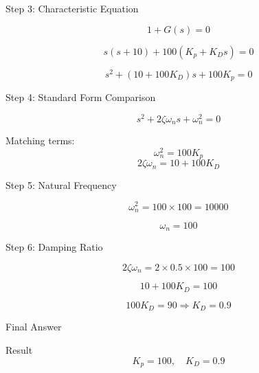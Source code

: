\documentclass{beamer}
\begin{document}
\begin{frame}{Step 3: Characteristic Equation}

\[
1 + G(s) = 0
\]

\[
s(s+10) + 100(K_p + K_D s) = 0
\]

\[
s^2 + (10 + 100K_D)s + 100K_p = 0
\]

\end{frame}

\begin{frame}{Step 4: Standard Form Comparison}

\[
s^2 + 2\zeta \omega_n s + \omega_n^2 = 0
\]

Matching terms:
\[
\omega_n^2 = 100K_p
\]
\[
2\zeta \omega_n = 10 + 100K_D
\]

\end{frame}

\begin{frame}{Step 5: Natural Frequency}

\[
\omega_n^2 = 100 \times 100 = 10000
\]

\[
\omega_n = 100
\]

\end{frame}

\begin{frame}{Step 6: Damping Ratio}

\[
2\zeta \omega_n = 2 \times 0.5 \times 100 = 100
\]

\[
10 + 100K_D = 100
\]

\[
100K_D = 90 \Rightarrow K_D = 0.9
\]

\end{frame}

\begin{frame}{Final Answer}

\begin{alertblock}{Result}
\[
K_p = 100,\quad K_D = 0.9
\]
\end{alertblock}

\end{frame}

	

\end{document}
